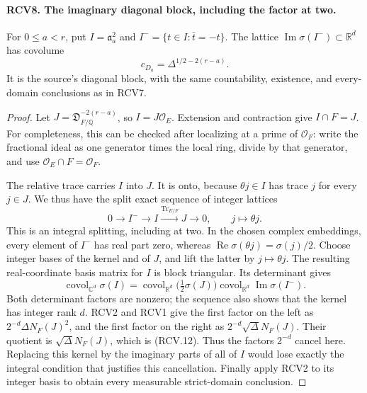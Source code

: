 \documentclass[11pt,a4paper]{article}
\numberwithin{equation}{section}
\theoremstyle{remark}\newtheorem{remark}[theorem]{Remark}
\begin{document}
\paragraph{RCV8. The imaginary diagonal block, including the factor at two.}
\label{claim:RCV8}
For \(0\leq a<r\), put
\(I=\mathfrak a_a^2\) and
\(I^- =\{t\in I:\bar t=-t\}\).  The lattice
\(\operatorname{Im}\sigma(I^-)\subset\mathbb R^d\) has covolume
\[
                  c_{D_a}=\Delta^{1/2-2(r-a)}.
\tag{RCV.12}
\]
It is the source's diagonal block, with the same countability,
existence, and every-domain conclusions as in RCV7.
\begin{proof}
Let \(J=\mathfrak D_{F/\mathbb Q}^{-2(r-a)}\), so
\(I=J\mathcal O_E\).  Extension and contraction give
\(I\cap F=J\).  For completeness, this can be checked after
localizing at a prime of \(\mathcal O_F\): write the fractional
ideal as one generator times the local ring, divide by that
generator, and use \(\mathcal O_E\cap F=\mathcal O_F\).

The relative trace carries \(I\) into \(J\).  It is onto,
because \(\theta j\in I\) has trace \(j\) for every \(j\in J\).
We thus have the split exact sequence of integer lattices
\[
 0\longrightarrow I^-\longrightarrow I
       \xrightarrow{\operatorname{Tr}_{E/F}}J\longrightarrow0,
 \qquad j\longmapsto\theta j.
\tag{RCV.13}
\]
This is an integral splitting, including at two.  In the chosen
complex embeddings, every element of \(I^-\) has real part zero,
whereas \(\operatorname{Re}\sigma(\theta j)=\sigma(j)/2\).
Choose integer bases of the kernel and of \(J\), and lift the
latter by \(j\mapsto\theta j\).  The resulting real-coordinate
basis matrix for \(I\) is block triangular.  Its determinant gives
\[
 \operatorname{covol}_{\mathbb C^d}\sigma(I)
 =\operatorname{covol}_{\mathbb R^d}\big(\tfrac12\sigma(J)\big)
       \operatorname{covol}_{\mathbb R^d}\operatorname{Im}\sigma(I^-).
\tag{RCV.14}
\]
Both determinant factors are nonzero; the sequence also shows that
the kernel has integer rank \(d\).  RCV2 and RCV1 give the first
factor on the left as \(2^{-d}\Delta N_F(J)^2\), and the
first factor on the right as \(2^{-d}\sqrt\Delta N_F(J)\).
Their quotient is \(\sqrt\Delta N_F(J)\), which is (RCV.12).
Thus the factors \(2^{-d}\) cancel here.  Replacing this kernel
by the imaginary parts of all of \(I\) would lose exactly the
integral condition that justifies this cancellation.
Finally apply RCV2 to its integer basis to obtain every measurable
strict-domain conclusion.
\end{proof}
\end{document}
